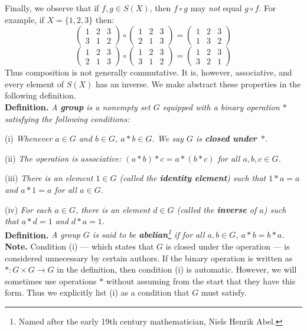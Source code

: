 \documentclass[leqno]{book}
\begin{document}
Finally, we observe that if $f,g\in S(X)$, then $f\circ g$ may \emph{not} equal $g\circ f$.  For example, if $X=\{1,2,3\}$ then:
$$\begin{pmatrix}1&2&3\\3&1&2\end{pmatrix}\circ\begin{pmatrix}1&2&3\\2&1&3\end{pmatrix}=\begin{pmatrix}1&2&3\\1&3&2\end{pmatrix}$$
$$\begin{pmatrix}1&2&3\\2&1&3\end{pmatrix}\circ\begin{pmatrix}1&2&3\\3&1&2\end{pmatrix}=\begin{pmatrix}1&2&3\\3&2&1\end{pmatrix}$$
Thus composition is not generally commutative.  It is, however, associative, and every element of $S(X)$ has an inverse.  We make abstract these properties in the following definition.\\

\noindent\textbf{Definition.} \emph{A \textbf{group} is a nonempty set $G$ equipped with a binary operation $*$ satisfying the following conditions:}

(i) \emph{Whenever $a\in G$ and $b\in G$, $a*b\in G$.  We say $G$ is \textbf{closed under}~$*$.}

(ii) \emph{The operation is associative: $(a*b)*c=a*(b*c)$ for all $a,b,c\in G$.}

(iii) \emph{There is an element $1\in G$ (called the \textbf{identity element}) such that $1*a=a$ and $a*1=a$ for all $a\in G$.}

(iv) \emph{For each $a\in G$, there is an element $d\in G$ (called the \textbf{inverse} of $a$) such that $a*d=1$ and $d*a=1$.}\\

\noindent\textbf{Definition.} \emph{A group $G$ is said to be \textbf{abelian}\footnote{Named after the early 19th century mathematician, Niels Henrik Abel.} if for all $a,b\in G$, $a*b=b*a$.}\\

\noindent\textbf{Note.} Condition (i) \---- which states that $G$ is closed under the operation \---- is considered unnecessary by certain authors.  If the binary operation is written as $*:G\times G\to G$ in the definition, then condition (i) is automatic.  However, we will sometimes use operations $*$ without assuming from the start that they have this form.  Thus we explicitly list (i) as a condition that $G$ must satisfy.\\
\end{document}
